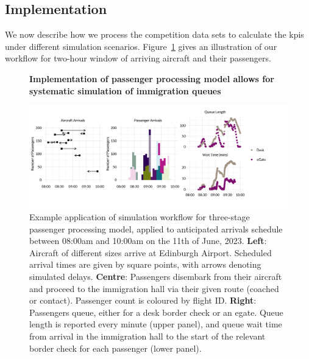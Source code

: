 \documentclass[10pt]{article}
\newcommand*{\figuretitle}[1]{%
    {\centering%
    \textbf{#1}%
    \par\medskip}%
}
\begin{document}

\subsection{Implementation}

We now describe how we process the competition data sets to calculate the \glspl{kpi} under different simulation scenarios. Figure~\ref{fig:workflow_fig} gives an illustration of our workflow for two-hour window of arriving aircraft and their passengers. 

\begin{figure}[!ht]
    \centering
    \figuretitle{Implementation of passenger processing model allows for systematic simulation of immigration queues}
    \includegraphics[width=1.1\textwidth]{figures/workflow_fig.png}
     \caption{Example application of simulation workflow for three-stage passenger processing model, applied to anticipated arrivals schedule between 08:00am and 10:00am on the 11th of June, 2023. \textbf{Left}: Aircraft of different sizes arrive at Edinburgh Airport. Scheduled arrival times are given by square points, with arrows denoting simulated delays. \textbf{Centre}: Passengers disembark from their aircraft and proceed to the immigration hall via their given route (coached or contact). Passenger count is coloured by flight ID. \textbf{Right}: Passengers queue, either for a desk border check or an \gls{egate}. Queue length is reported every minute (upper panel), and queue wait time from arrival in the immigration hall to the start of the relevant border check for each passenger (lower panel).} \label{fig:workflow_fig}
\end{figure}
\end{document}
